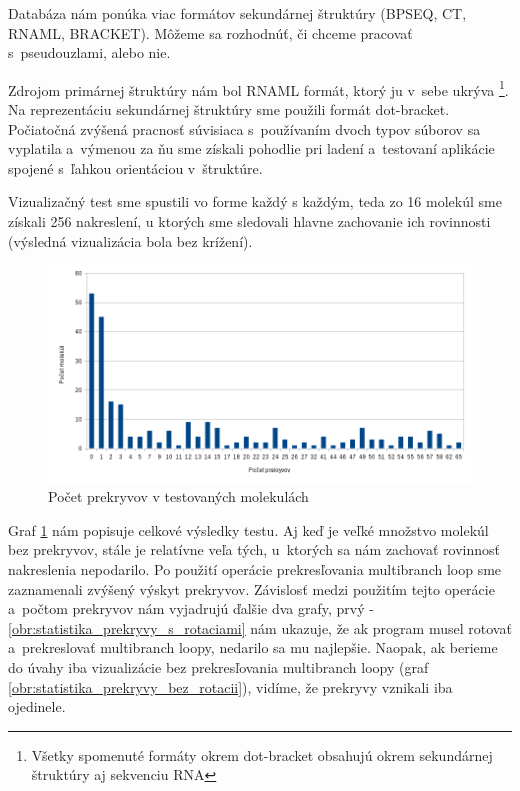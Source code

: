 Databáza nám ponúka viac formátov sekundárnej štruktúry (BPSEQ, CT, RNAML, BRACKET).
Môžeme sa rozhodnúť, či chceme pracovať s~pseudouzlami, alebo nie.

Zdrojom primárnej štruktúry nám bol RNAML formát, ktorý ju v~sebe ukrýva%
\footnote{Všetky spomenuté formáty okrem dot-bracket obsahujú okrem
sekundárnej štruktúry aj sekvenciu RNA}.
Na reprezentáciu sekundárnej štruktúry sme použili formát dot-bracket.
Počiatočná zvýšená pracnosť súvisiaca s~používaním dvoch typov súborov
sa vyplatila a~výmenou za ňu sme získali pohodlie pri ladení a~testovaní
aplikácie spojené s~ľahkou orientáciou v~štruktúre.

Vizualizačný test sme spustili vo forme každý s každým, teda zo
16 molekúl sme získali 256 nakreslení, u ktorých sme sledovali
hlavne zachovanie ich rovinnosti (výsledná vizualizácia bola bez krížení).

\begin{figure}
  \includegraphics[width=1\textwidth]{../img/statistika/prekryvy-pocetmolekul}
  \caption{Počet prekryvov v testovaných molekulách}
  \label{obr:statistika_prekryvy}
\end{figure}

Graf \ref{obr:statistika_prekryvy} nám popisuje celkové výsledky testu.
Aj keď je veľké množstvo molekúl bez prekryvov, stále je relatívne veľa tých,
u~ktorých sa nám zachovať rovinnosť nakreslenia nepodarilo.
Po použití operácie prekresľovania multibranch loop sme zaznamenali
zvýšený výskyt prekryvov. Závislosť medzi použitím tejto operácie
a~počtom prekryvov nám vyjadrujú ďalšie dva grafy,
prvý - \ref{obr:statistika_prekryvy_s_rotaciami} nám ukazuje, že ak
program musel rotovať a~prekreslovať multibranch loopy,
nedarilo sa mu najlepšie. Naopak, ak berieme do úvahy iba vizualizácie bez
prekresľovania multibranch loopy (graf \ref{obr:statistika_prekryvy_bez_rotacii}),
vidíme, že prekryvy vznikali iba ojedinele.

